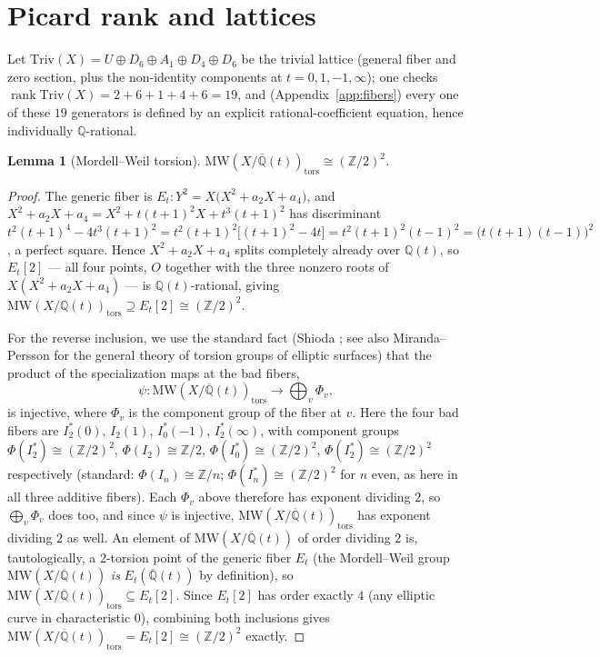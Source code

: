 \documentclass[11pt]{amsart}
\newtheorem{lemma}[theorem]{Lemma}
\theoremstyle{definition}
\newcommand{\Q}{\mathbb{Q}}
\newcommand{\Z}{\mathbb{Z}}
\newcommand{\Qbar}{\overline{\mathbb{Q}}}
\newcommand{\Triv}{\mathrm{Triv}}
\DeclareMathOperator{\rk}{rank}
\begin{document}
\section{Picard rank and lattices}
\label{sec:lattices}

Let $\mathrm{Triv}(X)=U\oplus D_6\oplus A_1\oplus D_4\oplus D_6$ be the trivial lattice (general fiber and zero section, plus the non-identity components at $t=0,1,-1,\infty$); one checks $\rk\Triv(X)=2+6+1+4+6=19$, and (Appendix~\ref{app:fibers}) every one of these $19$ generators is defined by an explicit rational-coefficient equation, hence individually $\Q$-rational.

\begin{lemma}[Mordell--Weil torsion]
\label{lem:torsion}
$\mathrm{MW}(X/\Qbar(t))_{\mathrm{tors}}\cong(\Z/2)^2$.
\end{lemma}

\begin{proof}
The generic fiber is $E_t:Y^2=X\bigl(X^2+a_2X+a_4\bigr)$, and $X^2+a_2X+a_4=X^2+t(t+1)^2X+t^3(t+1)^2$ has discriminant $t^2(t+1)^4-4t^3(t+1)^2=t^2(t+1)^2\bigl[(t+1)^2-4t\bigr]=t^2(t+1)^2(t-1)^2=\bigl(t(t+1)(t-1)\bigr)^2$, a perfect square. Hence $X^2+a_2X+a_4$ splits completely already over $\Q(t)$, so $E_t[2]$ — all four points, $O$ together with the three nonzero roots of $X(X^2+a_2X+a_4)$ — is $\Q(t)$-rational, giving $\mathrm{MW}(X/\Q(t))_{\mathrm{tors}}\supseteq E_t[2]\cong(\Z/2)^2$.

For the reverse inclusion, we use the standard fact (Shioda \cite{Shioda1990}; see also Miranda--Persson \cite{MirandaPersson1989} for the general theory of torsion groups of elliptic surfaces) that the product of the specialization maps at the bad fibers,
\[
\psi:\mathrm{MW}(X/\Qbar(t))_{\mathrm{tors}}\longrightarrow\bigoplus_v\Phi_v,
\]
is injective, where $\Phi_v$ is the component group of the fiber at $v$. Here the four bad fibers are $I_2^*(0)$, $I_2(1)$, $I_0^*(-1)$, $I_2^*(\infty)$, with component groups $\Phi(I_2^*)\cong(\Z/2)^2$, $\Phi(I_2)\cong\Z/2$, $\Phi(I_0^*)\cong(\Z/2)^2$, $\Phi(I_2^*)\cong(\Z/2)^2$ respectively (standard: $\Phi(I_n)\cong\Z/n$; $\Phi(I_n^*)\cong(\Z/2)^2$ for $n$ even, as here in all three additive fibers). Each $\Phi_v$ above therefore has exponent dividing $2$, so $\bigoplus_v\Phi_v$ does too, and since $\psi$ is injective, $\mathrm{MW}(X/\Qbar(t))_{\mathrm{tors}}$ has exponent dividing $2$ as well. An element of $\mathrm{MW}(X/\Qbar(t))$ of order dividing $2$ is, tautologically, a $2$-torsion point of the generic fiber $E_t$ (the Mordell--Weil group $\mathrm{MW}(X/\Qbar(t))$ \emph{is} $E_t(\Qbar(t))$ by definition), so $\mathrm{MW}(X/\Qbar(t))_{\mathrm{tors}}\subseteq E_t[2]$. Since $E_t[2]$ has order exactly $4$ (any elliptic curve in characteristic $0$), combining both inclusions gives $\mathrm{MW}(X/\Qbar(t))_{\mathrm{tors}}=E_t[2]\cong(\Z/2)^2$ exactly.
\end{proof}
\end{document}
